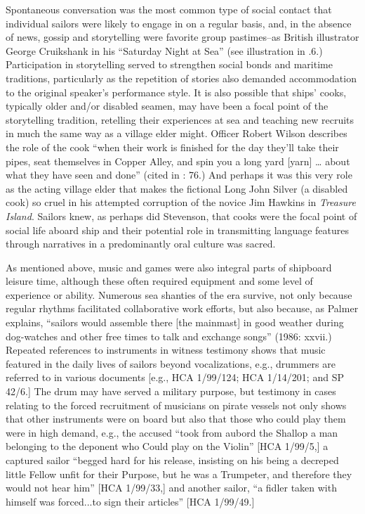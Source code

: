 Spontaneous conversation was the most common type of social contact that individual sailors were likely to engage in on a regular basis, and, in the absence of news, gossip and storytelling were favorite group pastimes--as British illustrator George Cruikshank in his “Saturday Night at Sea” (see illustration in .6.) Participation in storytelling served to strengthen social bonds and maritime traditions, particularly as the repetition of stories also demanded accommodation to the original speaker’s performance style. It is also possible that ships’ cooks, typically older and/or disabled seamen, may have been a focal point of the storytelling tradition, retelling their experiences at sea and teaching new recruits in much the same way as a village elder might. Officer Robert Wilson describes the role of the cook “when their work is finished for the day they’ll take their pipes, seat themselves in Copper Alley, and spin you a long yard [yarn] … about what they have seen and done” (cited in \citealt{AdkinsAdkins2008}: 76.) And perhaps it was this very role as the acting village elder that makes the fictional Long John Silver (a disabled cook) so cruel in his attempted corruption of the novice Jim Hawkins in  \textit{Treasure} \textit{Island}. Sailors knew, as perhaps did Stevenson, that cooks were the focal point of social life aboard ship and their potential role in transmitting language features through narratives in a predominantly oral culture was sacred. 

As mentioned above, music and games were also integral parts of shipboard leisure time, although these often required equipment and some level of experience or ability. Numerous sea shanties of the era survive, not only because regular rhythms facilitated collaborative work efforts, but also because, as Palmer explains, “sailors would assemble there [the mainmast] in good weather during dog-watches and other free times to talk and exchange songs” (1986: xxvii.) Repeated references to instruments in witness testimony shows that music featured in the daily lives of sailors beyond vocalizations, e.g., drummers are referred to in various documents [e.g., HCA 1/99/124; HCA 1/14/201; and SP 42/6.] The drum may have served a military purpose, but testimony in cases relating to the forced recruitment of musicians on pirate vessels not only  shows that other instruments were on board but also that those who could play them were in high demand, e.g., the accused “took from aubord the Shallop a man belonging to the deponent who Could play on the Violin” [HCA 1/99/5,] a captured sailor “begged hard for his release, insisting on his being a decreped little Fellow unfit for their Purpose, but he was a Trumpeter, and therefore they would not hear him” [HCA 1/99/33,] and another sailor, “a fidler taken with himself was forced...to sign their articles” [HCA 1/99/49.] 

